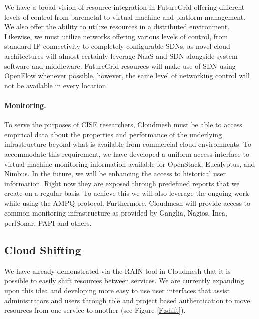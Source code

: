 \documentclass[graybox]{svmult}
\begin{document}
We have a broad vision of resource integration in FutureGrid offering different levels of control from baremetal to virtual machine and platform management. We also offer the ability to utilize resources in a distributed environment. Likewise, we must utilize networks offering various levels of control, from standard IP connectivity to completely configurable SDNs, as novel cloud architectures will almost certainly leverage NaaS and SDN alongside system software and middleware. FutureGrid resources will make use of SDN using OpenFlow whenever possible, however, the same level of networking control will not be available in every location. 

\paragraph{Monitoring.}

To serve the purposes of CISE researchers, Cloudmesh must be able to access empirical data about the properties and performance of the underlying infrastructure beyond what is available from commercial cloud environments. To accommodate this requirement, we have developed a uniform access interface to virtual machine monitoring information available for OpenStack, Eucalyptus, and Nimbus. In the future, we will be enhancing the access to historical user information. Right now they are exposed through predefined reports that we create on a regular basis. To achieve this we will also leverage the ongoing work while using the AMPQ protocol. Furthermore, Cloudmesh will provide access to common monitoring infrastructure as provided by Ganglia, Nagios, Inca, perfSonar, PAPI and others.



\subsection{Cloud Shifting}

We have already demonstrated via the RAIN tool in Cloudmesh that it is possible to easily shift resources between services. We are currently expanding upon this idea and developing more easy to use user interfaces that assist administrators and users through role and project based authentication to move resources from one service to another (see Figure \ref{F:shift}).
\end{document}
